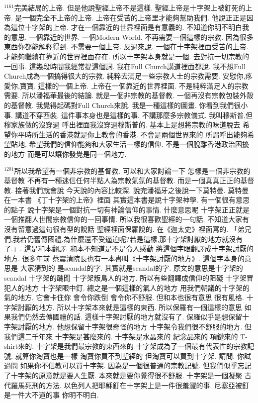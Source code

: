 \documentclass{book}
\begin{document}
$^{1161}$完美結局的上帝.
但是他說聖經上帝不是這樣.
聖經上帝是十字架上被釘死的上帝.
是一個完全不上帝的上帝.
上帝在受苦的上帝里才能夠幫助我們.
他說正正是因為這位十字架的上帝.
才在一個靠近的世界裡面是有意義的.
不知道你明不明白我的意思.
一個靠近的世界.
一個Modern World.
不再需要一個這樣的宗教.
因為很多東西你都能解釋得到.
不需要一個上帝.
反過來說.
一個在十字架裡面受苦的上帝.
才能夠繼續在靠近的世界裡面存在.
所以十字架本身就是一個.
去對抗一切宗教的一回事.
這幾段時間我經常提這個詞.
我在Full Church講道裡面都說.
我不想Full Church成為一個搞得很大的宗教.
純粹去滿足一些宗教人士的宗教需要.
安慰你,疼愛你,寶寶.
這樣的一個上帝.
上帝在一個靠近的世界裡面.
不是純粹滿足人的宗教需要.
所以潘福華最後的結論.
就是一個非宗教的基督教.
一個再沒有宗教包裝外殼的基督教.
我覺得起碼對Full Church來說.
我是一種這樣的圖畫.
你看到我們很小事.
講道不穿西裝.
這件事本身也是這樣的事.
不講那麼多宗教儀式.
我叫穆斯普,但穆家族做的沒穿過 呼出裡面我沒穿過穆斯普的.
基本上是想將宗教的味道脫去 希望你平時所生活的香港就是你上教會的香港.
不會是兩個世界來的 所謂呼出能夠希望貼地.
希望我們的信仰能夠和大家生活一樣的信仰.
不是一個脫離香港政治困擾的地方 而是可以讓你發覺是同一個地方.

$^{1201}$所以我希望有一個非宗教的基督教.
可以和大家討論一下 怎樣是一個非宗教的基督教 不再有一種迷信任何半點人為宗教氣氛的基督教.
而是一個真真正正的基督教.
接著我們就會說 今天說的內容比較深.
說完潘福牙之後說一下莫特曼.
莫特曼在一本書 《丁十字架的上帝》裡面 其實這本書是說十字架神學.
有一個很有意思的點子 說十字架是一個對抗一切有神論信仰的事情.
什麼意思呢 十字架正正就是一個推翻人世間宗教信仰的一回事情.
所以我很喜歡聖經的一句話.
不知道大家有沒有留意過這句很有型的說話 聖經裡面保羅說的.
在《迦太史》裡面寫的.
「弟兄們,我若仍舊傳國禮,為什麼還不受逼迫呢?若是這樣,那十字架討厭的地方就沒有了.」.
這是和本翻譯.
和本不知道是不是令人感動 將這個字眼翻譯成十字架討厭的地方.
很多年前 蔡震清院長也有一本書叫《十字架討厭的地方》.
這個字本身的意思是 大家猜到的 是scandal的字.
其實就是scandal的字.
原文的意思是十字架的scandal 十字架的醜聞 十字架叛島人的地方.
所以有些翻譯成信仰的阻礙 十字架冒犯人的地方 十字架眼中釘.
總之是一個這樣的氣人的地方 用我們朝議的十字架的氣的地方.
它會卡住你 會令你跌倒 會令你不舒服.
但和本也很有意思 很有風格.
十字架討厭的地方.
所以十字架本來就是這樣的東西.
所以保羅有一個這樣的意思 如果我們仍然去傳國禮的話.
這樣十字架討厭的地方就沒有了.
保羅似乎是想保留十字架討厭的地方.
他想保留十字架很奇怪的地方 十字架令我們很不舒服的地方.
但我們這二千年來 十字架是甚麼來的.
十字架是水晶來的 紀念品來的 項鏈來的 T-shirt來的.
十字架是我們最宗教的東西來的 十字架成為了一個最有代表性的宗教記號.
就算你淘寶也是一樣 淘寶你買不到聖經的 但淘寶可以買到十字架.
請問.
你試過問 如果你不信教可以買十字架.
因為是一個很普通的宗教記號.
但我們似乎忘記了十字架的原意就是要人生厭.
本來就是要你覺得很不舒服.
十字架是一個凝聚 古代羅馬死刑的方法.
以色列人把耶穌釘在十字架上是一件很羞澀的事.
尼塞亞被釘是一件大不道的事 你明不明白.
\end{document}
